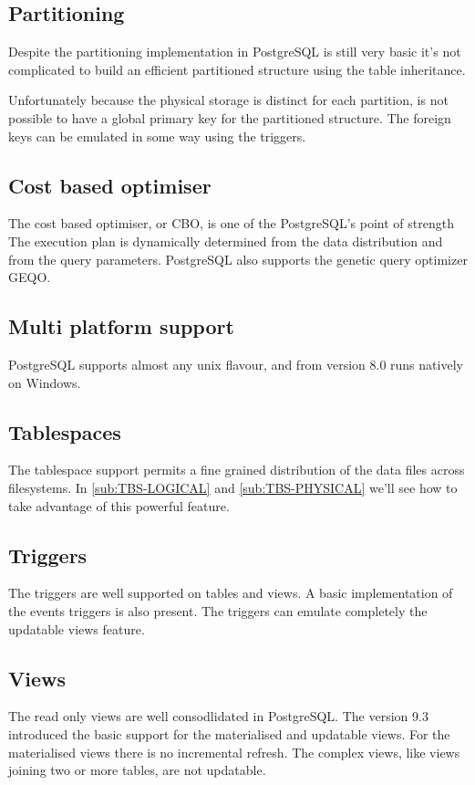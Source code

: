 \subsection{Partitioning}
Despite the partitioning implementation in
PostgreSQL is still very basic it's not complicated to build an efficient partitioned structure 
using 
the table inheritance.\newline

Unfortunately because the physical storage is distinct for each partition, is not possible to 
have a global primary key for the partitioned structure. The foreign keys can be emulated in some 
way using the triggers.

\subsection{Cost based optimiser}
The cost based optimiser, or CBO, is one of the PostgreSQL's 
point of strength The execution plan is dynamically determined from the data distribution and from 
the query parameters. PostgreSQL also supports the genetic query optimizer GEQO.


\subsection{Multi platform support}
PostgreSQL supports almost any unix flavour, and from version 8.0 runs natively on 
Windows.

\subsection{Tablespaces}
The tablespace support permits a fine grained distribution of the data files across
filesystems. In \ref{sub:TBS-LOGICAL} and \ref{sub:TBS-PHYSICAL} we'll see how to take advantage of 
this powerful feature.

\subsection{Triggers} 
The triggers are well supported on tables and views. A basic implementation of the events 
triggers is also present. The triggers can emulate completely the updatable views feature. 

\subsection{Views}
The read only views are well consodlidated in PostgreSQL.
The version 9.3 introduced the basic support for the materialised and updatable views.
For the materialised views there is no incremental refresh. The complex views, like views 
joining two or more tables, are not updatable. 

